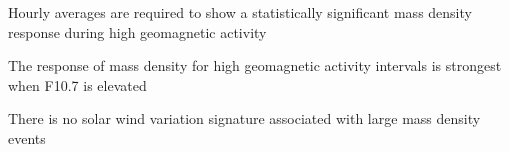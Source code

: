 \documentclass[draft,linenumbers]{agujournal}
\begin{document}




\begin{keypoints}
\item Hourly averages are required to show a statistically significant mass density response during high geomagnetic activity

\item The response of mass density for high geomagnetic activity intervals is strongest when F10.7 is elevated

\item There is no solar wind variation signature associated with large mass density events 
\end{keypoints}

%
%

\end{document}
